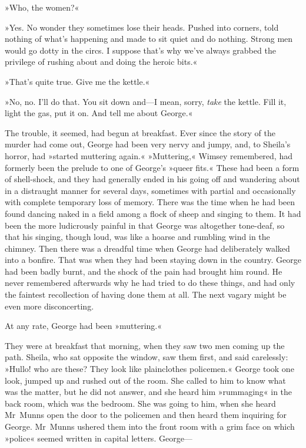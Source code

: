 »Who, the women?«

»Yes. No wonder they sometimes lose their heads. Pushed into corners, told nothing of what's happening and made to sit quiet and do nothing. Strong men would go dotty in the circs. I suppose that's why we've always grabbed the privilege of rushing about and doing the heroic bits.«

»That's quite true. Give me the kettle.«

»No, no. I'll do that. You sit down and—I mean, sorry, \textit{take} the kettle. Fill it, light the gas, put it on. And tell me about George.«

The trouble, it seemed, had begun at breakfast. Ever since the story of the murder had come out, George had been very nervy and jumpy, and, to Sheila's horror, had »started muttering again.« »Muttering,« Wimsey remembered, had formerly been the prelude to one of George's »queer fits.« These had been a form of shell-shock, and they had generally ended in his going off and wandering about in a distraught manner for several days, sometimes with partial and occasionally with complete temporary loss of memory. There was the time when he had been found dancing naked in a field among a flock of sheep and singing to them. It had been the more ludicrously painful in that George was altogether tone-deaf, so that his singing, though loud, was like a hoarse and rumbling wind in the chimney. Then there was a dreadful time when George had deliberately walked into a bonfire. That was when they had been staying down in the country. George had been badly burnt, and the shock of the pain had brought him round. He never remembered afterwards why he had tried to do these things, and had only the faintest recollection of having done them at all. The next vagary might be even more disconcerting.

At any rate, George had been »muttering.«

They were at breakfast that morning, when they saw two men coming up the path. Sheila, who sat opposite the window, saw them first, and said carelessly: »Hullo! who are these? They look like plainclothes policemen.« George took one look, jumped up and rushed out of the room. She called to him to know what was the matter, but he did not answer, and she heard him »rummaging« in the back room, which was the bedroom. She was going to him, when she heard Mr~Munns open the door to the policemen and then heard them inquiring for George. Mr~Munns ushered them into the front room with a grim face on which »police« seemed written in capital letters. George—

